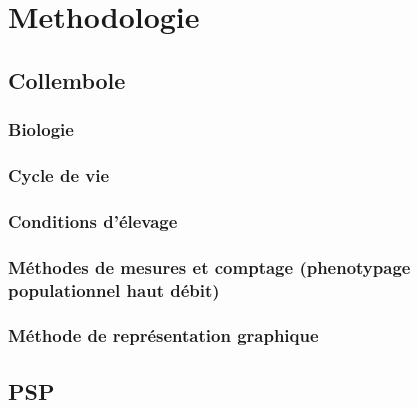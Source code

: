 \chapter{Methodologie}
	\section{Collembole}
		\subsection{Biologie}
		\subsection{Cycle de vie}
		\subsection{Conditions d’élevage}
		\subsection{Méthodes de mesures et comptage (phenotypage populationnel haut débit)}
		\subsection{Méthode de représentation graphique}
	\section{PSP}

